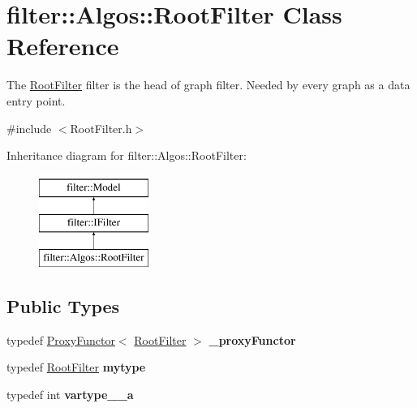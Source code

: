 \hypertarget{classfilter_1_1_algos_1_1_root_filter}{}\section{filter\+:\+:Algos\+:\+:Root\+Filter Class Reference}
\label{classfilter_1_1_algos_1_1_root_filter}


The \hyperlink{classfilter_1_1_algos_1_1_root_filter}{Root\+Filter} filter is the head of graph filter. Needed by every graph as a data entry point.  




{\ttfamily \#include $<$Root\+Filter.\+h$>$}

Inheritance diagram for filter\+:\+:Algos\+:\+:Root\+Filter\+:\begin{figure}[H]
\begin{center}
\leavevmode
\includegraphics[height=3.000000cm]{d6/df8/classfilter_1_1_algos_1_1_root_filter}
\end{center}
\end{figure}
\subsection*{Public Types}
\begin{DoxyCompactItemize}
\item 
\mbox{\label{classfilter_1_1_algos_1_1_root_filter_a8d1842b8db674924312979143f176de3}} 
typedef \hyperlink{class_proxy_functor}{Proxy\+Functor}$<$ \hyperlink{classfilter_1_1_algos_1_1_root_filter}{Root\+Filter} $>$ {\bfseries \+\_\+proxy\+Functor}
\item 
\mbox{\label{classfilter_1_1_algos_1_1_root_filter_ab69c462409f7c4a97680606d5c63d4ce}} 
typedef \hyperlink{classfilter_1_1_algos_1_1_root_filter}{Root\+Filter} {\bfseries mytype}
\item 
\mbox{\label{classfilter_1_1_algos_1_1_root_filter_a7b5d21eb82d3def56a1b9896ce55525e}} 
typedef int {\bfseries vartype\+\_\+\+\_\+a}
\end{DoxyCompactItemize}
